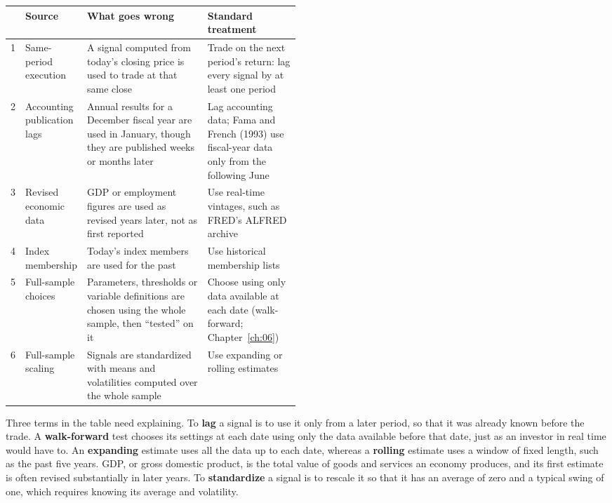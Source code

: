 \begin{center}
\small
\begin{tabularx}{0.9\linewidth}{@{}r>{\raggedright\arraybackslash}p{0.16\linewidth}>{\raggedright\arraybackslash}X>{\raggedright\arraybackslash}p{0.32\linewidth}@{}}
\toprule
 & Source & What goes wrong & Standard treatment \\
\midrule
1 & Same-period execution & A signal computed from today's closing price is used to trade at that same close & Trade on the next period's return: lag every signal by at least one period \\
2 & Accounting publication lags & Annual results for a December fiscal year are used in January, though they are published weeks or months later & Lag accounting data; Fama and French (1993) use fiscal-year data only from the following June \\
3 & Revised economic data & GDP or employment figures are used as revised years later, not as first reported & Use real-time vintages, such as FRED's ALFRED archive \\
4 & Index membership & Today's index members are used for the past & Use historical membership lists \\
5 & Full-sample choices & Parameters, thresholds or variable definitions are chosen using the whole sample, then ``tested'' on it & Choose using only data available at each date (walk-forward; Chapter~\ref{ch:06}) \\
6 & Full-sample scaling & Signals are standardized with means and volatilities computed over the whole sample & Use expanding or rolling estimates \\
\bottomrule
\end{tabularx}
\end{center}


Three terms in the table need explaining. To \textbf{lag} a signal is to use it only from a later period, so that it was already known before the trade. A \textbf{walk-forward} test chooses its settings at each date using only the data available before that date, just as an investor in real time would have to. An \textbf{expanding} estimate uses all the data up to each date, whereas a \textbf{rolling} estimate uses a window of fixed length, such as the past five years. GDP, or gross domestic product, is the total value of goods and services an economy produces, and its first estimate is often revised substantially in later years. To \textbf{standardize} a signal is to rescale it so that it has an average of zero and a typical swing of one, which requires knowing its average and volatility.

